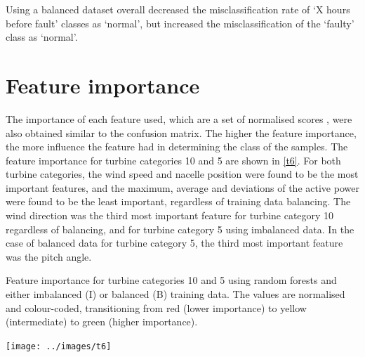 Using a balanced dataset overall decreased the misclassification rate of `X
hours before fault' classes as `normal', but increased the misclassification
of the `faulty' class as `normal'.

\section{Feature importance}

The importance of each feature used, which are a set of normalised scores
\cite{Rudy13}, were also obtained similar to the confusion matrix. The higher
the feature importance, the more influence the feature had in determining the
class of the samples. The feature importance for turbine categories 10 and 5
are shown in \autoref{t6}. For both turbine categories, the wind speed and
nacelle position were found to be the most important features, and the
maximum, average and deviations of the active power were found to be the least
important, regardless of training data balancing. The wind direction was the
third most important feature for turbine category 10 regardless of balancing,
and for turbine category 5 using imbalanced data. In the case of balanced data
for turbine category 5, the third most important feature was the pitch angle.

\begin{table}
  \centering
  \caption{\label{t6}Feature importance for turbine categories 10 and 5 using
  random forests and either imbalanced (I) or balanced (B) training data. The
  values are normalised and colour-coded, transitioning from red (lower
  importance) to yellow (intermediate) to green (higher importance).}
  \texttt{[image: ../images/t6]}
\end{table}
